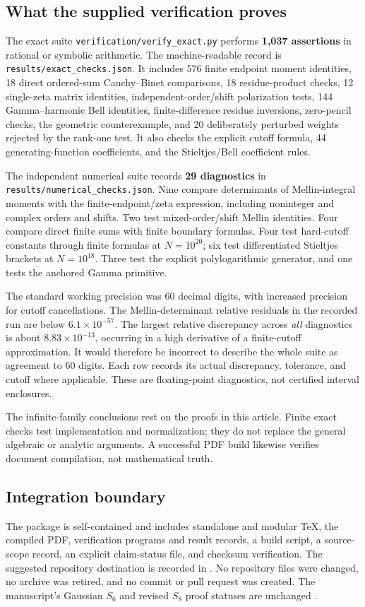\subsection{What the supplied verification proves}
The exact suite \texttt{verification/verify\_exact.py} performs
\textbf{1,037 assertions} in rational or symbolic arithmetic. The
machine-readable record is \texttt{results/exact\_checks.json}.
It includes 576 finite endpoint moment identities, 18 direct ordered-sum
Cauchy--Binet comparisons, 18 residue-product checks, 12 single-zeta
matrix identities, independent-order/shift polarization tests, 144
Gamma--harmonic Bell identities, finite-difference residue inversions,
zero-pencil checks, the geometric counterexample, and 20 deliberately
perturbed weights rejected by the rank-one test. It also checks the
explicit cutoff formula, 44 generating-function coefficients, and the
Stieltjes/Bell coefficient rules.

The independent numerical suite records \textbf{29 diagnostics} in
\texttt{results/numerical\_checks.json}. Nine compare determinants of
Mellin-integral moments with the finite-endpoint/zeta expression, including
noninteger and complex orders and shifts. Two test mixed-order/shift
Mellin identities. Four compare direct finite sums with finite boundary
formulas. Four test hard-cutoff constants through finite formulas at
$N=10^{20}$; six test differentiated Stieltjes brackets at $N=10^{18}$.
Three test the explicit polylogarithmic generator, and one tests the
anchored Gamma primitive.

The standard working precision was 60 decimal digits, with increased
precision for cutoff cancellations. The Mellin-determinant relative
residuals in the recorded run are below $6.1\times10^{-57}$.
The largest relative discrepancy across \emph{all} diagnostics is about
$8.83\times10^{-13}$, occurring in a high derivative of a finite-cutoff
approximation. It would therefore be incorrect to describe the whole
suite as agreement to 60 digits. Each row records its actual discrepancy,
tolerance, and cutoff where applicable. These are floating-point
diagnostics, not certified interval enclosures.

The infinite-family conclusions rest on the proofs in this article.
Finite exact checks test implementation and normalization; they do not
replace the general algebraic or analytic arguments. A successful PDF
build likewise verifies document compilation, not mathematical truth.

\subsection{Integration boundary}
The package is self-contained and includes standalone and modular TeX,
the compiled PDF, verification programs and result records, a build
script, a source-scope record, an explicit claim-status file, and checksum
verification. The suggested repository destination is recorded in
. No repository files were changed,
no archive was retired, and no commit or pull request was created.
The manuscript's Gaussian $S_6$ and revised $S_8$ proof statuses are
unchanged \cite{repo:discovery}.
